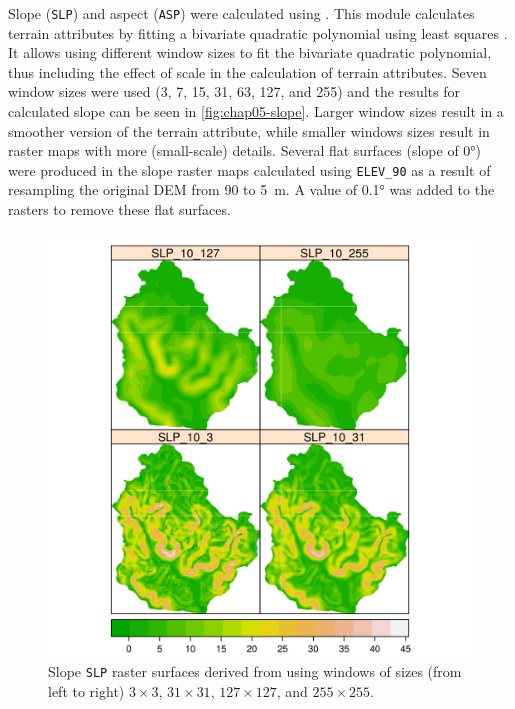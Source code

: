 Slope (\texttt{SLP}) and aspect (\texttt{ASP}) were calculated using . This module 
calculates 
terrain attributes by fitting a bivariate quadratic polynomial using least squares \cite{Wood1996}. It allows 
using different window sizes to fit the bivariate quadratic polynomial, thus including the effect of scale in 
the calculation of terrain attributes. Seven window sizes were used (3, 7, 15, 31, 63, 127, and 255) and the 
results for calculated slope can be seen in \autoref{fig:chap05-slope}. Larger window sizes result in a 
smoother version of the terrain attribute, while smaller windows sizes result in raster maps with more 
(small-scale) details. Several flat surfaces (slope of \ang{0}) were produced in the slope raster maps 
calculated using \texttt{ELEV\_90} as a result of resampling the original DEM from \num{90} to \SI{5}{\m}. A 
value of \ang{0.1} was added to the rasters to remove these flat surfaces.

\begin{figure}[!ht]
\centering
\includegraphics{fig/chap05-slope}
\caption[Slope derived using windows of different sizes.]{Slope \texttt{SLP} raster surfaces derived from 
\demNew{} using windows of sizes (from left to right) $3 \times 3$, $31 \times 31$, $127 \times 127$, and $255 
\times 255$.}
\label{fig:chap05-slope}
\end{figure}

